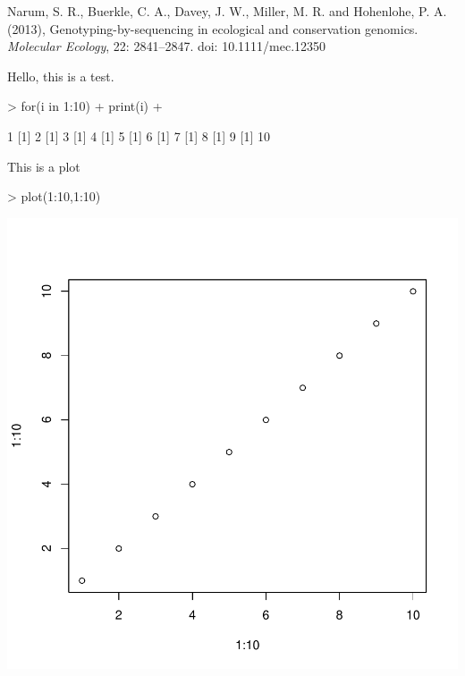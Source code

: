 \documentclass{article}
\begin{document}
Narum, S. R., Buerkle, C. A., Davey, J. W., Miller, M. R. and Hohenlohe, P. A. (2013), Genotyping-by-sequencing in ecological and conservation genomics. \emph{Molecular Ecology}, 22: 2841–2847. doi: 10.1111/mec.12350









Hello, this is a test. 
\begin{Schunk}
\begin{Sinput}
> for(i in 1:10){
+   print(i)
+ }
\end{Sinput}
\begin{Soutput}
[1] 1
[1] 2
[1] 3
[1] 4
[1] 5
[1] 6
[1] 7
[1] 8
[1] 9
[1] 10
\end{Soutput}
\end{Schunk}
This is a plot
\begin{Schunk}
\begin{Sinput}
> plot(1:10,1:10)
\end{Sinput}
\end{Schunk}
\includegraphics{Tutorial_for_RADseq_Tools-010}
\end{document}
